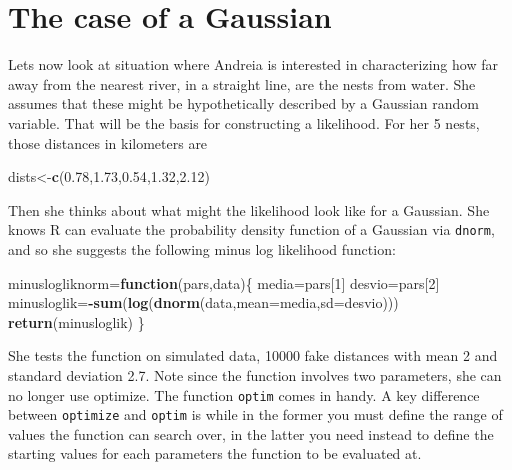 \documentclass[
]{book}
\newenvironment{Shaded}{\begin{snugshade}}{\end{snugshade}}
\newcommand{\AttributeTok}[1]{\textcolor[rgb]{0.13,0.29,0.53}{#1}}
\newcommand{\ControlFlowTok}[1]{\textcolor[rgb]{0.13,0.29,0.53}{\textbf{#1}}}
\newcommand{\DecValTok}[1]{\textcolor[rgb]{0.00,0.00,0.81}{#1}}
\newcommand{\FloatTok}[1]{\textcolor[rgb]{0.00,0.00,0.81}{#1}}
\newcommand{\FunctionTok}[1]{\textcolor[rgb]{0.13,0.29,0.53}{\textbf{#1}}}
\newcommand{\NormalTok}[1]{#1}
\newcommand{\OtherTok}[1]{\textcolor[rgb]{0.56,0.35,0.01}{#1}}
\newcommand{\SpecialCharTok}[1]{\textcolor[rgb]{0.81,0.36,0.00}{\textbf{#1}}}
\begin{document}
\hypertarget{the-case-of-a-gaussian}{%
\section{The case of a Gaussian}\label{the-case-of-a-gaussian}}

Lets now look at situation where Andreia is interested in characterizing how far away from the nearest river, in a straight line, are the nests from water. She assumes that these might be hypothetically described by a Gaussian random variable. That will be the basis for constructing a likelihood. For her 5 nests, those distances in kilometers are

\begin{Shaded}
\begin{Highlighting}[]
\NormalTok{dists}\OtherTok{\textless{}{-}}\FunctionTok{c}\NormalTok{(}\FloatTok{0.78}\NormalTok{,}\FloatTok{1.73}\NormalTok{,}\FloatTok{0.54}\NormalTok{,}\FloatTok{1.32}\NormalTok{,}\FloatTok{2.12}\NormalTok{)}
\end{Highlighting}
\end{Shaded}

Then she thinks about what might the likelihood look like for a Gaussian. She knows R can evaluate the probability density function of a Gaussian via \texttt{dnorm}, and so she suggests the following minus log likelihood function:

\begin{Shaded}
\begin{Highlighting}[]
\NormalTok{minuslogliknorm}\OtherTok{=}\ControlFlowTok{function}\NormalTok{(pars,data)\{}
\NormalTok{  media}\OtherTok{=}\NormalTok{pars[}\DecValTok{1}\NormalTok{]}
\NormalTok{  desvio}\OtherTok{=}\NormalTok{pars[}\DecValTok{2}\NormalTok{]}
\NormalTok{  minusloglik}\OtherTok{=}\SpecialCharTok{{-}}\FunctionTok{sum}\NormalTok{(}\FunctionTok{log}\NormalTok{(}\FunctionTok{dnorm}\NormalTok{(data,}\AttributeTok{mean=}\NormalTok{media,}\AttributeTok{sd=}\NormalTok{desvio)))}
  \FunctionTok{return}\NormalTok{(minusloglik)}
\NormalTok{\}}
\end{Highlighting}
\end{Shaded}

She tests the function on simulated data, 10000 fake distances with mean 2 and standard deviation 2.7. Note since the function involves two parameters, she can no longer use optimize. The function \texttt{optim} comes in handy. A key difference between \texttt{optimize} and \texttt{optim} is while in the former you must define the range of values the function can search over, in the latter you need instead to define the starting values for each parameters the function to be evaluated at.
\end{document}
